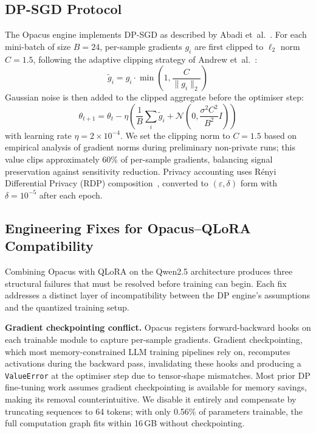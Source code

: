 \documentclass[conference]{IEEEtran}
\begin{document}
\subsection{DP-SGD Protocol}

The Opacus engine implements DP-SGD as described by Abadi et~al.~\cite{abadi2016deep}. For each mini-batch of size $B=24$, per-sample gradients $g_i$ are first clipped to $\ell_2$ norm $C=1.5$, following the adaptive clipping strategy of Andrew et~al.~\cite{andrew2021differentially}:
\begin{equation}
  \tilde{g}_i = g_i \cdot \min\!\left(1, \frac{C}{\|g_i\|_2}\right)
\end{equation}
Gaussian noise is then added to the clipped aggregate before the optimiser step:
\begin{equation}
  \theta_{t+1} = \theta_t - \eta \left(\frac{1}{B}\sum_i \tilde{g}_i + \mathcal{N}\!\left(0, \frac{\sigma^2 C^2}{B^2}I\right)\right)
\end{equation}
with learning rate $\eta = 2 \times 10^{-4}$. We set the clipping norm to $C=1.5$ based on empirical analysis of gradient norms during preliminary non-private runs; this value clips approximately 60\% of per-sample gradients, balancing signal preservation against sensitivity reduction. Privacy accounting uses R\'{e}nyi Differential Privacy (RDP) composition~\cite{mironov2017renyi}, converted to $(\varepsilon, \delta)$ form with $\delta = 10^{-5}$ after each epoch.

\subsection{Engineering Fixes for Opacus--QLoRA Compatibility}

Combining Opacus with QLoRA on the Qwen2.5 architecture produces three structural failures that must be resolved before training can begin. Each fix addresses a distinct layer of incompatibility between the DP engine's assumptions and the quantized training setup.

\textbf{Gradient checkpointing conflict.} Opacus registers forward-backward hooks on each trainable module to capture per-sample gradients. Gradient checkpointing, which most memory-constrained LLM training pipelines rely on, recomputes activations during the backward pass, invalidating these hooks and producing a \texttt{ValueError} at the optimiser step due to tensor-shape mismatches. Most prior DP fine-tuning work assumes gradient checkpointing is available for memory savings, making its removal counterintuitive. We disable it entirely and compensate by truncating sequences to 64 tokens; with only 0.56\% of parameters trainable, the full computation graph fits within 16\,GB without checkpointing.
\end{document}
